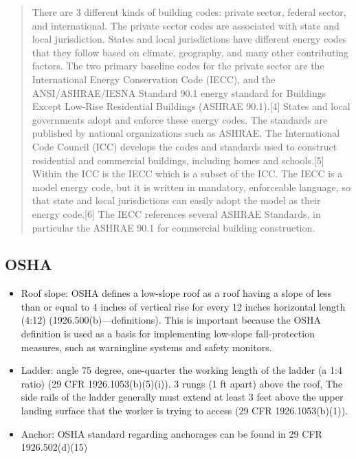 \documentclass[]{article}
\begin{document}
\begin{quote}
There are 3 different kinds of building codes: private sector, federal
sector, and international. The private sector codes are associated with
state and local jurisdiction. States and local jurisdictions have
different energy codes that they follow based on climate, geography, and
many other contributing factors. The two primary baseline codes for the
private sector are the International Energy Conservation Code (IECC),
and the ANSI/ASHRAE/IESNA Standard 90.1 energy standard for Buildings
Except Low-Rise Residential Buildings (ASHRAE 90.1).{[}4{]} States and
local governments adopt and enforce these energy codes. The standards
are published by national organizations such as ASHRAE. The
International Code Council (ICC) develops the codes and standards used
to construct residential and commercial buildings, including homes and
schools.{[}5{]} Within the ICC is the IECC which is a subset of the ICC.
The IECC is a model energy code, but it is written in mandatory,
enforceable language, so that state and local jurisdictions can easily
adopt the model as their energy code.{[}6{]} The IECC references several
ASHRAE Standards, in particular the ASHRAE 90.1 for commercial building
construction.
\end{quote}

\subsection{OSHA}\label{osha}

\begin{itemize}
\item
  Roof slope: OSHA defines a low-slope roof as a roof having a slope of
  less than or equal to 4 inches of vertical rise for every 12 inches
  horizontal length (4:12) (1926.500(b)---definitions). This is
  important because the OSHA definition is used as a basis for
  implementing low-slope fall-protection measures, such as warningline
  systems and safety monitors.
\item
  Ladder: angle 75 degree, one-quarter the working length of the ladder
  (a 1:4 ratio) (29 CFR 1926.1053(b)(5)(i)). 3 rungs (1 ft apart) above
  the roof, The side rails of the ladder generally must extend at least
  3 feet above the upper landing surface that the worker is trying to
  access (29 CFR 1926.1053(b)(1)).
\item
  Anchor: OSHA standard regarding anchorages can be found in 29 CFR
  1926.502(d)(15)
\end{itemize}
\end{document}
